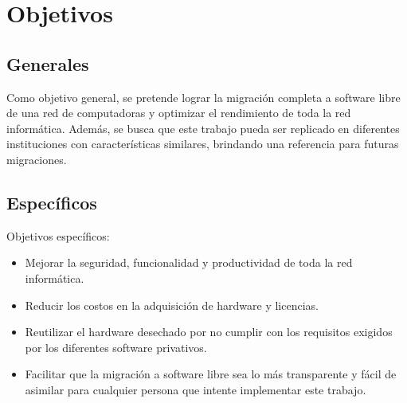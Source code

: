 \chapter{Objetivos}\label{ch:objetivos}

	\section{Generales}\label{sec:generales}
		
		Como objetivo general, se pretende lograr la migración completa a software libre de una red de computadoras y optimizar el rendimiento de toda la red informática. Además, se busca que este trabajo pueda ser replicado en diferentes instituciones con características similares, brindando una referencia para futuras migraciones.\par
	
	\section{Específicos}\label{sec:especificos}
	
			Objetivos específicos:
			
			\begin{itemize}
						
   				 \item Mejorar la seguridad, funcionalidad y productividad de toda la red informática.
  				
  				 \item  Reducir los costos en la adquisición de hardware y licencias.

  				 \item  Reutilizar el hardware desechado por no cumplir con los requisitos exigidos por los diferentes software privativos.

 				  \item  Facilitar que la migración a software libre sea lo más transparente y fácil de asimilar para cualquier persona que intente implementar este trabajo.			
			
			\end{itemize}